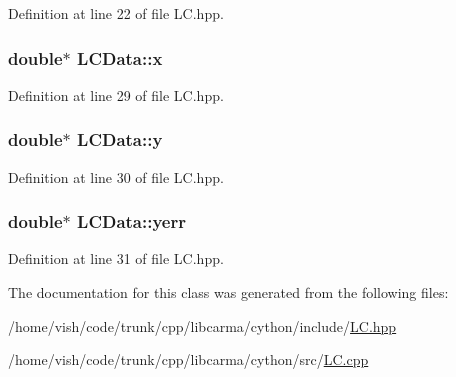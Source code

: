 Definition at line 22 of file L\-C.\-hpp.

\hypertarget{class_l_c_data_a617ec6819e34f2c3b92af6236604ae22}{
\subsubsection[{x}]{\setlength{\rightskip}{0pt plus 5cm}double$\ast$ L\-C\-Data\-::x}}\label{class_l_c_data_a617ec6819e34f2c3b92af6236604ae22}


Definition at line 29 of file L\-C.\-hpp.

\hypertarget{class_l_c_data_a48a0e8c8bb6cdaf00a7b6bac28fb5751}{
\subsubsection[{y}]{\setlength{\rightskip}{0pt plus 5cm}double$\ast$ L\-C\-Data\-::y}}\label{class_l_c_data_a48a0e8c8bb6cdaf00a7b6bac28fb5751}


Definition at line 30 of file L\-C.\-hpp.

\hypertarget{class_l_c_data_a4bed19db03704655b351259402b317e0}{
\subsubsection[{yerr}]{\setlength{\rightskip}{0pt plus 5cm}double$\ast$ L\-C\-Data\-::yerr}}\label{class_l_c_data_a4bed19db03704655b351259402b317e0}


Definition at line 31 of file L\-C.\-hpp.



The documentation for this class was generated from the following files\-:\begin{DoxyCompactItemize}
\item 
/home/vish/code/trunk/cpp/libcarma/cython/include/\hyperlink{_l_c_8hpp}{L\-C.\-hpp}\item 
/home/vish/code/trunk/cpp/libcarma/cython/src/\hyperlink{_l_c_8cpp}{L\-C.\-cpp}\end{DoxyCompactItemize}
